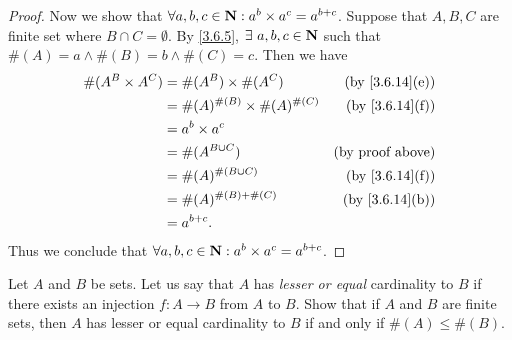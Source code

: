 \begin{proof}
  Now we show that \(\forall a, b, c \in \mathbf{N} : a^b \times a^c = a^{b + c}\).
  Suppose that \(A, B, C\) are finite set where \(B \cap C = \emptyset\).
  By \cref{3.6.5}, \(\exists\ a, b, c \in \N\) such that \(\#(A) = a \land \#(B) = b \land \#(C) = c\).
  Then we have
  \begin{align*}
    \#(A^B \times A^C) & = \#(A^B) \times \#(A^C)             & \text{(by \cref{3.6.14}(e))} \\
                       & = \#(A)^{\#(B)} \times \#(A)^{\#(C)} & \text{(by \cref{3.6.14}(f))} \\
                       & = a^b \times a^c                                                    \\
                       & = \#(A^{B \cup C})                   & \text{(by proof above)}      \\
                       & = \#(A)^{\#(B \cup C)}               & \text{(by \cref{3.6.14}(f))} \\
                       & = \#(A)^{\#(B) + \#(C)}              & \text{(by \cref{3.6.14}(b))} \\
                       & = a^{b + c}.
  \end{align*}
  Thus we conclude that \(\forall a, b, c \in \mathbf{N} : a^b \times a^c = a^{b + c}\).
\end{proof}

\begin{exercise}\label{ex 3.6.7}
  Let \(A\) and \(B\) be sets.
  Let us say that \(A\) has \emph{lesser or equal} cardinality to \(B\) if there exists an injection \(f : A \to B\) from \(A\) to \(B\).
  Show that if \(A\) and \(B\) are finite sets, then \(A\) has lesser or equal cardinality to \(B\) if and only if \(\#(A) \leq \#(B)\).
\end{exercise}


